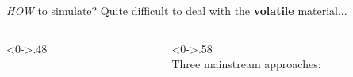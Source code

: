 \documentclass{beamer}
\begin{document}
\begin{frame}{\emph{HOW} to simulate?}
  \textcolor[rgb]{0.5,0.5,0.5}{Quite difficult to deal with the \textbf{\color{blue}volatile} material...}
  \begin{columns}[T] %
    \begin{column}<0->{.48\textwidth}
      \begin{figure}[thpb]
        \centering
        \label{fig:system}
      \end{figure}
    \end{column}%
    \hfill%
    \begin{column}<0->{.58\textwidth}
      \\
      \small Three mainstream approaches:
      \begin{itemize}

\end{itemize}
\end{column}
\end{columns}
\end{frame}
\end{document}
